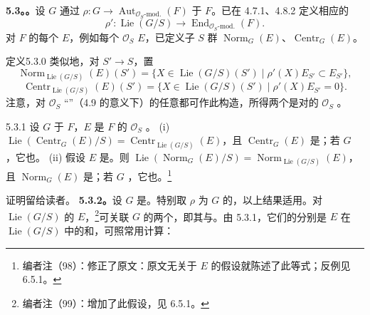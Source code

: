 \textbf{5.3。。}设 $G$ 通过 $\rho:G\to\operatorname{Aut}_{\mathcal O_S\text{-mod.}}(F)$ 于 $F$。已在 4.7.1、4.8.2 定义相应的
\[\rho':\operatorname{Lie}(G/S)\to\operatorname{End}_{\mathcal O_S\text{-mod.}}(F).\]
对 $F$ 的每个 $E$，例如每个 $\mathcal O_S$  $E$，已定义子 $S$ 群 $\operatorname{Norm}_G(E)$、$\operatorname{Centr}_G(E)$。
\begin{SGAresult}{定义}{5.3.0}
类似地，对 $S'\to S$，置
\[\operatorname{Norm}_{\operatorname{Lie}(G/S)}(E)(S')=\{X\in\operatorname{Lie}(G/S)(S')\mid\rho'(X)E_{S'}\subset E_{S'}\},\]
\[\operatorname{Centr}_{\operatorname{Lie}(G/S)}(E)(S')=\{X\in\operatorname{Lie}(G/S)(S')\mid\rho'(X)E_{S'}=0\}.\]
注意，对 $\mathcal O_S$ “”（4.9 的意义下）的任意都可作此构造，所得两个是对的 $\mathcal O_S$ 。
\end{SGAresult}
\begin{SGAresult}{}{5.3.1}
设 $G$ 于 $F$，$E$ 是 $F$ 的 $\mathcal O_S$ 。
(i) $\operatorname{Lie}(\operatorname{Centr}_G(E)/S)=\operatorname{Centr}_{\operatorname{Lie}(G/S)}(E)$，且 $\operatorname{Centr}_G(E)$ 是；若 $G$ ，它也。
(ii) 假设 $E$ 是。则 $\operatorname{Lie}(\operatorname{Norm}_G(E)/S)=\operatorname{Norm}_{\operatorname{Lie}(G/S)}(E)$，且 $\operatorname{Norm}_G(E)$ 是；若 $G$ ，它也。\footnote{编者注（98）：修正了原文：原文无关于 $E$ 的假设就陈述了此等式；反例见 6.5.1。}
\end{SGAresult}
证明留给读者。
\textbf{5.3.2。}设 $G$ 是。特别取 $\rho$ 为 $G$ 的，以上结果适用。对 $\operatorname{Lie}(G/S)$ 的 $E$，\footnote{编者注（99）：增加了此假设，见 6.5.1。}可关联 $G$ 的两个，即其与。由 5.3.1，它们的分别是 $E$ 在 $\operatorname{Lie}(G/S)$ 中的和，可照常用计算：
